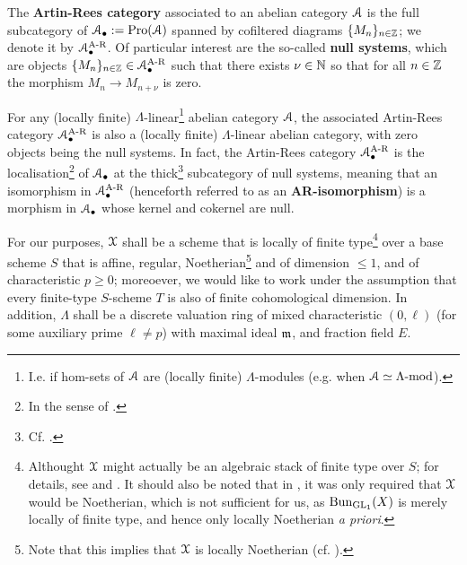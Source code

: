             \begin{definition} \label{def: artin_rees_categories}
                The \textbf{Artin-Rees category} associated to an abelian category $\mathcal{A}$ is the full subcategory of $\mathcal{A}_{\bullet} := \mathrm{Pro}(\mathcal{A})$ spanned by cofiltered diagrams $\{M_n\}_{n \in \mathbb{Z}}$; we denote it by $\mathcal{A}_{\bullet}^{\mathrm{A\text{-}R}}$. Of particular interest are the so-called \textbf{null systems}, which are objects $\{M_n\}_{n \in \mathbb{Z}} \in \mathcal{A}_{\bullet}^{\mathrm{A\text{-}R}}$ such that there exists $\nu \in \mathbb{N}$ so that for all $n \in \mathbb{Z}$ the morphism $M_n \to M_{n + \nu}$ is zero.
            \end{definition}
            
            \begin{proposition} \label{prop: artin_rees_categories_are_linear_and_abelian}
                \cite[Expos\'e V, Propositions 2.2.2 et 2.4.1]{sga5} For any (locally finite) $\Lambda$-linear\footnote{I.e. if hom-sets of $\mathcal{A}$ are (locally finite) $\Lambda$-modules (e.g. when $\mathcal{A} \simeq \Lambda\text{-}\mathrm{mod}$).} abelian category $\mathcal{A}$, the associated Artin-Rees category $\mathcal{A}_{\bullet}^{\mathrm{A\text{-}R}}$ is also a (locally finite) $\Lambda$-linear abelian category, with zero objects being the null systems. In fact, the Artin-Rees category $\mathcal{A}_{\bullet}^{\mathrm{A\text{-}R}}$ is the localisation\footnote{In the sense of \cite[\href{https://stacks.math.columbia.edu/tag/02MS}{Tag 02MS}]{stacks}.} of $\mathcal{A}_{\bullet}$ at the thick\footnote{Cf. \cite[\href{https://stacks.math.columbia.edu/tag/02MO}{Tag 02MO}]{stacks}.} subcategory of null systems, meaning that an isomorphism in $\mathcal{A}_{\bullet}^{\mathrm{A\text{-}R}}$ (henceforth referred to as an \textbf{AR-isomorphism}) is a morphism in $\mathcal{A}_{\bullet}$ whose kernel and cokernel are null. 
            \end{proposition}
            
            \begin{convention} \label{conv: l_adic_sheaves_conventions}
                For our purposes, $\mathcal{X}$ shall be a scheme that is locally of finite type\footnote{Althought $\mathcal{X}$ might actually be an algebraic stack of finite type over $S$; for details, see \cite{laszlo_olsson_adic_sheaves_on_artin_stacks_1} and \cite{laszlo_olsson_adic_sheaves_on_artin_stacks_2}. It should also be noted that in \cite[Subsection 1.4]{conrad_etale_cohomology}, it was only required that $\mathcal{X}$ would be Noetherian, which is not sufficient for us, as $\mathrm{Bun}_{\operatorname{GL}_1}(X)$ is merely locally of finite type, and hence only locally Noetherian \textit{a priori}.} over a base scheme $S$ that is affine, regular, Noetherian\footnote{Note that this implies that $\mathcal{X}$ is locally Noetherian (cf. \cite[\href{https://stacks.math.columbia.edu/tag/01T6}{Tag 01T6}]{stacks}).} and of dimension $\leq 1$, and of characteristic $p \geq 0$; moreoever, we would like to work under the assumption that every finite-type $S$-scheme $T$ is also of finite cohomological dimension. In addition, $\Lambda$ shall be a discrete valuation ring of mixed characteristic $(0, \ell)$ (for some auxiliary prime $\ell \not = p$) with maximal ideal $\mathfrak{m}$, and fraction field $E$.
            \end{convention}
            
